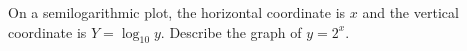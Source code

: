 On a semilogarithmic plot, the horizontal coordinate is $x$ and the vertical coordinate is $Y=\log_{10}y$. Describe the graph of $y=2^x$.
